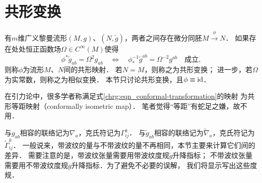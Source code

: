 


\section{共形变换}\label{chrg:sec_conformal-transformation}
有$m$维广义黎曼流形$(M,g)$、$(N,\tilde{g})$，两者之间存在微分同胚$M\overset{\phi}{\to}N$．
如果存在处处恒正函数场$\Omega \in C^\infty(M)$使得
\begin{equation}\label{chrg:eqn_conformal-transformation}
    \phi^* \tilde{g}_{ab} = \Omega^2 g_{ab} \quad \Leftrightarrow \quad
    \phi_*^{-1}\tilde{g}^{ab} = \Omega^{-2} g^{ab}
    \quad \text{成立},
\end{equation}
则称$\phi$为流形$M$、$N$间的{\heiti 共形映射}．
若$N=M$，则称之为{\heiti 共形变换}；
进一步，若$\Omega$为实常数，则称之为{\heiti 相似变换}．
本节只讨论共形变换，且$\phi\equiv {\rm id}$．

在引力论中，很多学者称满足式\eqref{chrg:eqn_conformal-transformation}的映射
为{\kaishu 共形等距映射（conformally isometric map）}．
笔者觉得“等距”有蛇足之嫌，故不用．

与$g_{ab}$相容的联络记为$\nabla_a$，克氏符记为$\Gamma_{ij}^k$．
与$\tilde{g}_{ab}$相容的联络记为$\tilde{\nabla}_a$，克氏符记为$\tilde{\Gamma}_{ij}^k$．
一般说来，带波纹的量与不带波纹的量不再相同，本节主要来计算它们间的差异．
需要注意的是，带波纹张量需要用带波纹度规$\tilde{g}$升降指标；
不带波纹张量需要用不带波纹度规$g$升降指标．为了避免不必要的误解，
我们将显示写出这些度规．


